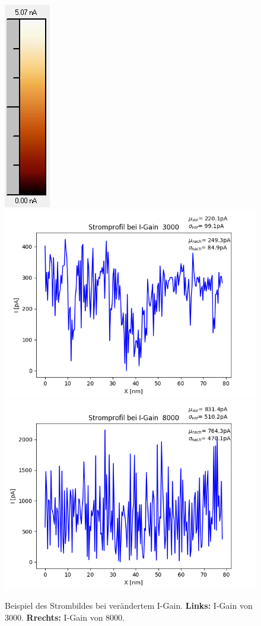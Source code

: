 \documentclass[12pt,a4paper]{article}
\begin{document}
\begin{figure}
\includegraphics[scale=0.6]{Bilder/Anhang/IGain/Strom/8000_IGain_Strom_vor_Skala.jpg}
\includegraphics[scale=0.5]{Bilder/Anhang/IGain/Strom/figure_1.png}
\includegraphics[scale=0.5]{Bilder/Anhang/IGain/Strom/figure_2.png}
\caption{Beispiel des Strombildes bei verändertem I-Gain. \textbf{Links:} I-Gain von 3000. \textbf{Rrechts:} I-Gain von 8000.}
\label{fig:Strom}
\end{figure}
\end{document}
